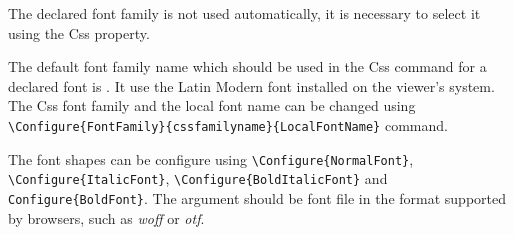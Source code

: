 

The declared font family is not used automatically, it is necessary to select
it using the  Css property.

The default font family name which should be used in the Css
 command for a declared font is . 
It use the Latin Modern font installed on the viewer's system. 
The Css font family and the local font name can be changed using
\verb|\Configure{FontFamily}{cssfamilyname}{LocalFontName}| command.

\begin{texsource}
\end{texsource}

The font shapes can be configure using \verb|\Configure{NormalFont}|, 
\verb|\Configure{ItalicFont}|, \verb|\Configure{BoldItalicFont}| and
\verb|Configure{BoldFont}|. The argument should be font file in the format
supported by browsers, such as \textit{woff} or \textit{otf}.


\begin{texsource}
\end{texsource}
